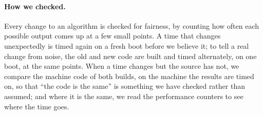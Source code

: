 \documentclass[letterpaper,11pt]{article}
\begin{document}
\paragraph{How we checked.} Every change to an algorithm is checked for
fairness, by counting how often each possible output comes up at a few
small points. A time that changes unexpectedly is timed again on a
fresh boot before we believe it; to tell a real change from noise, the
old and new code are built and timed alternately, on one boot, at the
same points. When a time changes but the source has not, we compare the
machine code of both builds, on the machine the results are timed on,
so that ``the code is the same'' is something we have checked rather
than assumed; and where it is the same, we read the performance
counters to see where the time goes.
\end{document}
